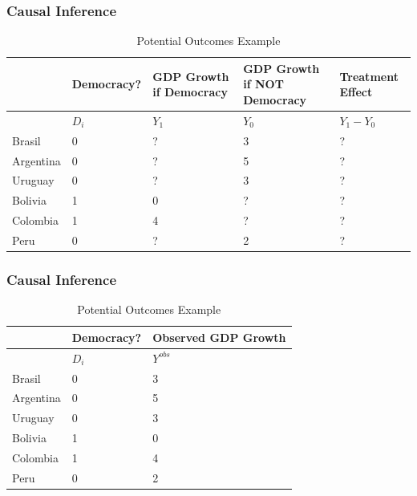 \documentclass[xcolor=x11names,compress]{beamer}\usepackage[]{graphicx}\usepackage[]{color}
\renewcommand{\(}{\begin{columns}}
\renewcommand{\)}{\end{columns}}
\newcommand{\<}[1]{\begin{column}{#1}}
\renewcommand{\>}{\end{column}}
\begin{document}
\begin{frame}
\frametitle{Causal Inference}
\footnotesize
\begin{table}[htbp]
  \centering
  \caption{Potential Outcomes Example}
    \begin{tabular}{|p{1.8cm}|p{1.8cm}|p{2cm}|p{2cm}|p{2cm}|}
    \hline
          & \multicolumn{1}{p{1.8cm}|}{Democracy?} & \multicolumn{1}{p{2cm}|}{GDP Growth if Democracy} & \multicolumn{1}{p{2.2cm}|}{GDP Growth if NOT Democracy} & Treatment Effect \bigstrut\\
    \hline
          & \multicolumn{1}{p{1.8cm}|}{$D_i$} & \multicolumn{1}{p{2cm}|}{$Y_1$} & \multicolumn{1}{p{2.2cm}|}{$Y_0$} & \multicolumn{1}{p{1.8cm}|}{$Y_{1} - Y_{0}$} \bigstrut\\
    \hline
    Brasil & 0 & ?     & 3     & ? \bigstrut\\
    \hline
    Argentina & 0 & ?    & 5     & ? \bigstrut\\
    \hline
    Uruguay & 0 & ? & 3 & ?  \bigstrut\\
    \hline
    Bolivia & 1  & 0     & ?     & ? \bigstrut\\
    \hline
    Colombia & 1  & 4    & ?    & ? \bigstrut\\
    \hline
    Peru & 0 & ?     & 2     & ? \bigstrut\\
\hline
    \end{tabular}%
  \label{tab:addlabel}%
\end{table}%
\normalsize
\end{frame}

\begin{frame}
\frametitle{Causal Inference}
\footnotesize
\begin{table}[htbp]
  \centering
  \caption{Potential Outcomes Example}
    \begin{tabular}{|p{1.8cm}|p{1.8cm}|p{2cm}|}
    \hline
          & \multicolumn{1}{p{1.8cm}|}{Democracy?} & \textbf{Observed} GDP Growth \bigstrut\\
    \hline
          & \multicolumn{1}{p{1.8cm}|}{$D_i$} & \multicolumn{1}{p{1.8cm}|}{$Y^{obs}$} \bigstrut\\
    \hline
    Brasil & 0 & 3 \bigstrut\\
    \hline
    Argentina & 0      & 5 \bigstrut\\
    \hline
    Uruguay & 0 & 3  \bigstrut\\
    \hline
    Bolivia & 1      & 0 \bigstrut\\
    \hline
    Colombia & 1    & 4 \bigstrut\\
    \hline
    Peru & 0 & 2 \bigstrut\\
    \hline
    \end{tabular}%
  \label{tab:addlabel}%
\end{table}%
\normalsize
\end{frame}
\end{document}
